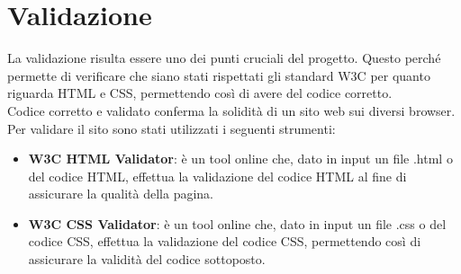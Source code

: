 \section{Validazione}
La validazione risulta essere uno dei punti cruciali del progetto. Questo perché permette di verificare che siano stati rispettati gli standard W3C per quanto riguarda HTML e CSS, permettendo così di avere del codice corretto.\\
Codice corretto e validato conferma la solidità di un sito web sui diversi browser. \\
Per validare il sito sono stati utilizzati i seguenti strumenti:
\begin{itemize}
	\item \textbf{W3C HTML Validator}: è un tool online che, dato in input un file .html o del codice HTML, effettua la validazione del codice HTML al fine di assicurare la qualità della pagina.
	\item \textbf{W3C CSS Validator}: è un tool online che, dato in input un file .css o del codice CSS, effettua la validazione del codice CSS, permettendo così di assicurare la validità del codice sottoposto.
\end{itemize}